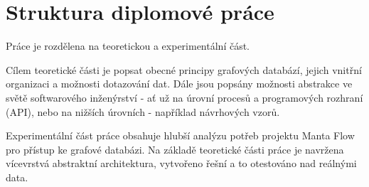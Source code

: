 \section{Struktura diplomové práce}
Práce je rozdělena na teoretickou a experimentální část. 

Cílem teoretické části je popsat obecné principy grafových databází, jejich vnitřní organizaci a možnosti dotazování dat. Dále jsou popsány možnosti abstrakce ve světě softwarového inženýrství - ať už na úrovní procesů a programových rozhraní (API), nebo na nižších úrovních - například návrhových vzorů. 

Experimentální část práce obsahuje hlubší analýzu potřeb projektu Manta Flow pro přístup ke grafové databázi. Na základě teoretické části práce je navržena vícevrstvá abstraktní architektura, vytvořeno  řešní a to otestováno nad reálnými data. 
